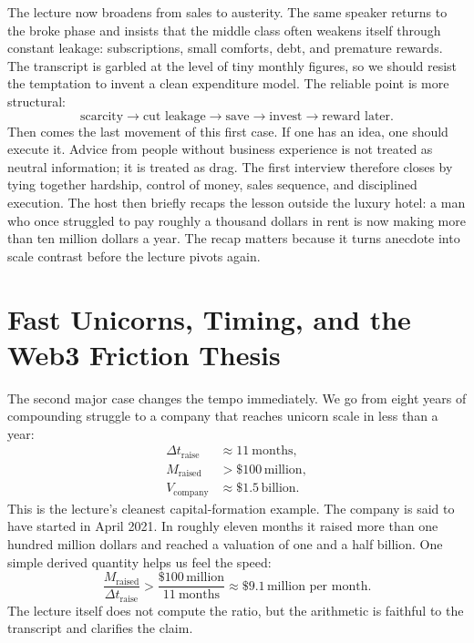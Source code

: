 The lecture now broadens from sales to austerity. The same speaker returns to the broke phase and insists that the middle class often weakens itself through constant leakage: subscriptions, small comforts, debt, and premature rewards. The transcript is garbled at the level of tiny monthly figures, so we should resist the temptation to invent a clean expenditure model. The reliable point is more structural:
\begin{equation}
\text{scarcity} \to \text{cut leakage} \to \text{save} \to \text{invest} \to \text{reward later}.
\end{equation}
Then comes the last movement of this first case. If one has an idea, one should execute it. Advice from people without business experience is not treated as neutral information; it is treated as drag. The first interview therefore closes by tying together hardship, control of money, sales sequence, and disciplined execution. The host then briefly recaps the lesson outside the luxury hotel: a man who once struggled to pay roughly a thousand dollars in rent is now making more than ten million dollars a year. The recap matters because it turns anecdote into scale contrast before the lecture pivots again.

\section{Fast Unicorns, Timing, and the Web3 Friction Thesis}

The second major case changes the tempo immediately. We go from eight years of compounding struggle to a company that reaches unicorn scale in less than a year:
\begin{align}
\Delta t_{\text{raise}} &\approx 11\ \text{months}, \\
M_{\text{raised}} &> \$100\,\text{million}, \\
V_{\text{company}} &\approx \$1.5\,\text{billion}.
\end{align}
This is the lecture's cleanest capital-formation example. The company is said to have started in April 2021. In roughly eleven months it raised more than one hundred million dollars and reached a valuation of one and a half billion. One simple derived quantity helps us feel the speed:
\begin{equation}
\frac{M_{\text{raised}}}{\Delta t_{\text{raise}}}
>
\frac{\$100\,\text{million}}{11\ \text{months}}
\approx
\$9.1\,\text{million per month}.
\end{equation}
The lecture itself does not compute the ratio, but the arithmetic is faithful to the transcript and clarifies the claim.

